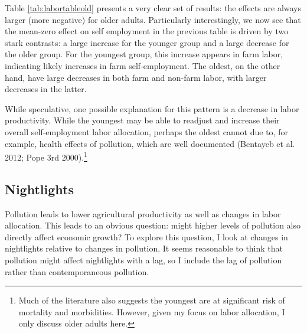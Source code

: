 \documentclass[
]{article}
\begin{document}
Table \ref{tab:labortableold} presents a very clear set of results: the effects are always larger (more negative) for older adults. Particularly interestingly, we now see that the mean-zero effect on self employment in the previous table is driven by two stark contrasts: a large increase for the younger group and a large decrease for the older group. For the youngest group, this increase appears in farm labor, indicating likely increases in farm self-employment. The oldest, on the other hand, have large decreases in both farm and non-farm labor, with larger decreases in the latter.

While speculative, one possible explanation for this pattern is a decrease in labor productivity. While the youngest may be able to readjust and increase their overall self-employment labor allocation, perhaps the oldest cannot due to, for example, health effects of pollution, which are well documented (Bentayeb et al. 2012; Pope 3rd 2000).\footnote{Much of the literature also suggests the youngest are at significant risk of mortality and morbidities. However, given my focus on labor allocation, I only discuss older adults here.}

\hypertarget{nightlights}{%
\subsection{Nightlights}\label{nightlights}}

Pollution leads to lower agricultural productivity as well as changes in labor allocation. This leads to an obvious question: might higher levels of pollution also directly affect economic growth? To explore this question, I look at changes in nightlights relative to changes in pollution. It seems reasonable to think that pollution might affect nightlights with a lag, so I include the lag of pollution rather than contemporaneous pollution.
\end{document}
